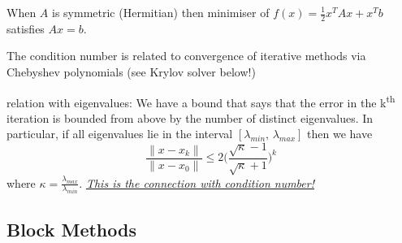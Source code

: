 
When $A$ is symmetric (Hermitian) then minimiser of $f(x) = \frac12 x^T Ax + x^T b$ satisfies
$Ax=b$.



The condition number is related to convergence of iterative methods via Chebyshev polynomials (see Krylov solver below!)

relation with eigenvalues: We have a bound that says that the error in the k\textsuperscript{th} iteration is bounded from above
by the number of distinct eigenvalues. In particular, if all eigenvalues lie in the interval $[\lambda_{min},\,\lambda_{max}]$ then we
have 
\[
\frac{\|x-x_k\|}{\|x-x_0\|} \leq 2 \Big(\frac{\sqrt{\kappa}-1}{\sqrt{\kappa}+1}\Big)^k
\]
where $\kappa = \frac{\lambda_{max}}{\lambda_{min}}$.
\underline{\emph{This is the connection with condition number!}}


\subsection{Block Methods}

